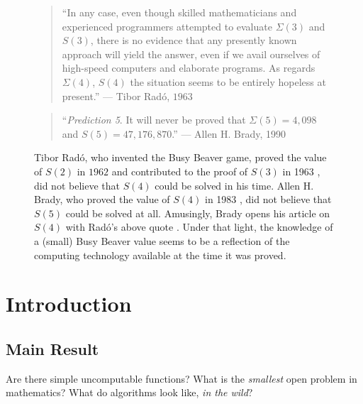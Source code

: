 \documentclass[a4paper,british]{article}
\theoremstyle{definition} %
\numberwithin{equation}{section}
\theoremstyle{definition} %
\newcommand{\BBtheFifth}{47{,}176{,}870}
\newcommand{\SigmaTheFifth}{4{,}098}
\newcommand{\radofull}{Tibor Rad\'o\xspace}
\newcommand{\rado}{Rad\'o\xspace}
\begin{document}
\begin{figure}
    \begin{quote}
        ``In any case, even though skilled mathematicians and experienced programmers attempted to evaluate $\Sigma(3)$ and $S(3)$, there is no evidence that any presently known approach will yield the answer, even if we avail ourselves of high-speed computers and elaborate programs. As regards $\Sigma(4)$, $S(4)$ the situation seems to be entirely hopeless at present.'' --- \radofull, $1963$ \cite{Rado_1963}
    \end{quote}
    \begin{quote}
        ``\textit{Prediction 5}. It will never be proved that $\Sigma(5) = \SigmaTheFifth$ and $S(5) = \BBtheFifth$.'' --- Allen H. Brady, 1990 \cite{BradyMeaningOfLife}
    \end{quote}
    \caption{\radofull, who invented the Busy Beaver game, proved the value of $S(2)$ in $1962$ \cite{Rado_1962} and contributed to the proof of $S(3)$ in 1963 \cite{Lin1963}, did not believe that $S(4)$ could be solved in his time. Allen H. Brady, who proved the value of $S(4)$ in 1983 \cite{Brady83}, did not believe that $S(5)$ could be solved at all. Amusingly, Brady opens his article on $S(4)$ with \rado's above quote \cite{Brady83}. Under that light, the knowledge of a (small) Busy Beaver value seems to be a reflection of the computing technology available at the time it was proved.}\label{fig:hope}
\end{figure}

\vspace{-40pt}

\section{Introduction}\label{sec:intro}

\subsection{Main Result}\label{sec:intro:mainresults}

\newcommand{\noncomput}{uncomputable\xspace}
\newcommand{\BBfull}{Busy Beaver\xspace}
\newcommand{\Coq}{Coq\xspace}
\newcommand{\CoqProofReleaseURL}{\url{https://github.com/ccz181078/Coq-BB5}}

\newcommand{\ie}{i.e.~}
\newcommand{\eg}{e.g.~}

Are there simple \noncomput functions? What is the \textit{smallest} open problem in mathematics? What do algorithms look like, \textit{in the wild}?
\end{document}

